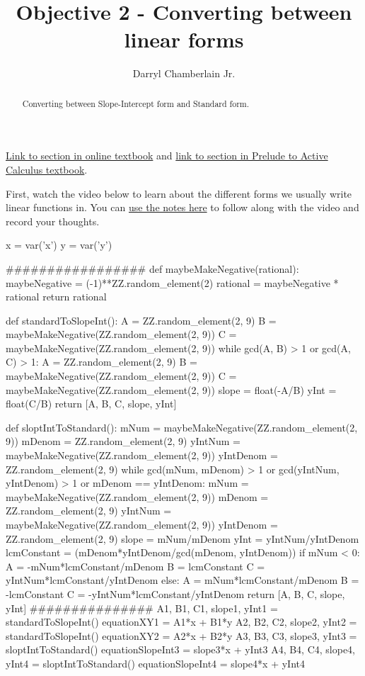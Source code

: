 \documentclass{ximera}
\author{Darryl Chamberlain Jr.}
\title{Objective 2 - Converting between linear forms}
\begin{document}
\begin{abstract}
Converting between Slope-Intercept form and Standard form.
\end{abstract}
\maketitle

\href{https://cnx.org/contents/mwjClAV_@8.1:62_eXnY6@14/Linear-Equations-in-One-Variable}{Link to section in online textbook} and 
\href{https://activecalculus.org/prelude/sec-changing-linear.html}{link to section in Prelude to Active Calculus textbook}.


First, watch the video below to learn about the different forms we usually write linear functions in. You can \href{http://people.clas.ufl.edu/dchamberlain31/files/Objective-2-Converting-between-linear-forms.pdf}{use the notes here} to follow along with the video and record your thoughts.


\begin{sagesilent}
x = var('x')
y = var('y')

#################
def maybeMakeNegative(rational):
    maybeNegative = (-1)**ZZ.random_element(2)
    rational = maybeNegative * rational
    return rational

def standardToSlopeInt():
    A = ZZ.random_element(2, 9)
    B = maybeMakeNegative(ZZ.random_element(2, 9))
    C = maybeMakeNegative(ZZ.random_element(2, 9))
    while gcd(A, B) > 1 or gcd(A, C) > 1:
        A = ZZ.random_element(2, 9)
        B = maybeMakeNegative(ZZ.random_element(2, 9))
        C = maybeMakeNegative(ZZ.random_element(2, 9))
    slope = float(-A/B)
    yInt = float(C/B)
    return [A, B, C, slope, yInt]

def sloptIntToStandard():
    mNum = maybeMakeNegative(ZZ.random_element(2, 9))
    mDenom = ZZ.random_element(2, 9)
    yIntNum = maybeMakeNegative(ZZ.random_element(2, 9))
    yIntDenom = ZZ.random_element(2, 9)
    while gcd(mNum, mDenom) > 1 or gcd(yIntNum, yIntDenom) > 1 or mDenom == yIntDenom:
        mNum = maybeMakeNegative(ZZ.random_element(2, 9))
        mDenom = ZZ.random_element(2, 9)
        yIntNum = maybeMakeNegative(ZZ.random_element(2, 9))
        yIntDenom = ZZ.random_element(2, 9)
    slope = mNum/mDenom
    yInt = yIntNum/yIntDenom
    lcmConstant = (mDenom*yIntDenom/gcd(mDenom, yIntDenom))
    if mNum < 0:
        A = -mNum*lcmConstant/mDenom
        B = lcmConstant
        C = yIntNum*lcmConstant/yIntDenom
    else:
        A = mNum*lcmConstant/mDenom
        B = -lcmConstant
        C = -yIntNum*lcmConstant/yIntDenom
    return [A, B, C, slope, yInt]
###############
A1, B1, C1, slope1, yInt1 = standardToSlopeInt()
equationXY1 = A1*x + B1*y
A2, B2, C2, slope2, yInt2 = standardToSlopeInt()
equationXY2 = A2*x + B2*y
A3, B3, C3, slope3, yInt3 = sloptIntToStandard()
equationSlopeInt3 = slope3*x + yInt3
A4, B4, C4, slope4, yInt4 = sloptIntToStandard()
equationSlopeInt4 = slope4*x + yInt4
\end{sagesilent}
\end{document}
